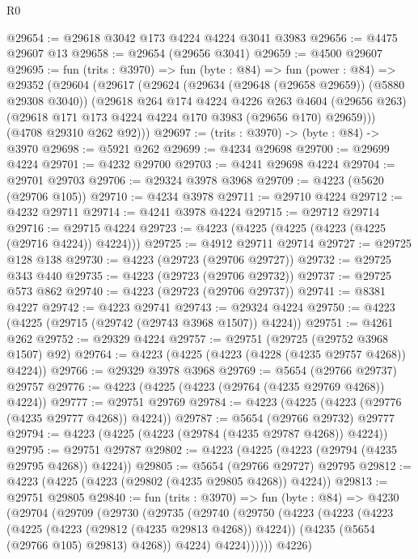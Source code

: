 \begin{lexlean}{R0}
\begin{coremodule}
@29654 := @29618 @3042 @173 @4224 @4224 @3041 @3983
@29656 := @4475 @29607 @13
@29658 := @29654 (@29656 @3041)
@29659 := @4500 @29607
@29695 := fun (trits : @3970) =>
  fun (byte : @84) =>
  fun (power : @84) =>
  @29352
    (@29604
      (@29617
        (@29624
          (@29634 (@29648 (@29658 @29659)) (@5880 @29308 @3040))
          (@29618
            @264
            @174
            @4224
            @4226
            @263
            @4604
            (@29656 @263)
            (@29618 @171 @173 @4224 @4224 @170 @3983 (@29656 @170) @29659)))
        (@4708 @29310 @262 @92)))
@29697 := (trits : @3970) -> (byte : @84) -> @3970
@29698 := @5921 @262
@29699 := @4234 @29698
@29700 := @29699 @4224
@29701 := @4232 @29700
@29703 := @4241 @29698 @4224
@29704 := @29701 @29703
@29706 := @29324 @3978 @3968
@29709 := @4223 (@5620 (@29706 @105))
@29710 := @4234 @3978
@29711 := @29710 @4224
@29712 := @4232 @29711
@29714 := @4241 @3978 @4224
@29715 := @29712 @29714
@29716 := @29715 @4224
@29723 := @4223 (@4225 (@4225 (@4223 (@4225 (@29716 @4224)) @4224)))
@29725 := @4912 @29711 @29714
@29727 := @29725 @128 @138
@29730 := @4223 (@29723 (@29706 @29727))
@29732 := @29725 @343 @440
@29735 := @4223 (@29723 (@29706 @29732))
@29737 := @29725 @573 @862
@29740 := @4223 (@29723 (@29706 @29737))
@29741 := @8381 @4227
@29742 := @4223 @29741
@29743 := @29324 @4224
@29750 := @4223 (@4225 (@29715 (@29742 (@29743 @3968 @1507)) @4224))
@29751 := @4261 @262
@29752 := @29329 @4224
@29757 := @29751 (@29725 (@29752 @3968 @1507) @92)
@29764 := @4223 (@4225 (@4223 (@4228 (@4235 @29757 @4268)) @4224))
@29766 := @29329 @3978 @3968
@29769 := @5654 (@29766 @29737) @29757
@29776 := @4223 (@4225 (@4223 (@29764 (@4235 @29769 @4268)) @4224))
@29777 := @29751 @29769
@29784 := @4223 (@4225 (@4223 (@29776 (@4235 @29777 @4268)) @4224))
@29787 := @5654 (@29766 @29732) @29777
@29794 := @4223 (@4225 (@4223 (@29784 (@4235 @29787 @4268)) @4224))
@29795 := @29751 @29787
@29802 := @4223 (@4225 (@4223 (@29794 (@4235 @29795 @4268)) @4224))
@29805 := @5654 (@29766 @29727) @29795
@29812 := @4223 (@4225 (@4223 (@29802 (@4235 @29805 @4268)) @4224))
@29813 := @29751 @29805
@29840 := fun (trits : @3970) =>
  fun (byte : @84) =>
  @4230
    (@29704
      (@29709
        (@29730
          (@29735
            (@29740
              (@29750
                (@4223
                  (@4223
                    (@4223
                      (@4225 (@4223 (@29812 (@4235 @29813 @4268)) @4224))
                      (@4235 (@5654 (@29766 @105) @29813) @4268))
                    @4224)
                  @4224))))))
      @4226)

\end{coremodule}
\end{lexlean}
